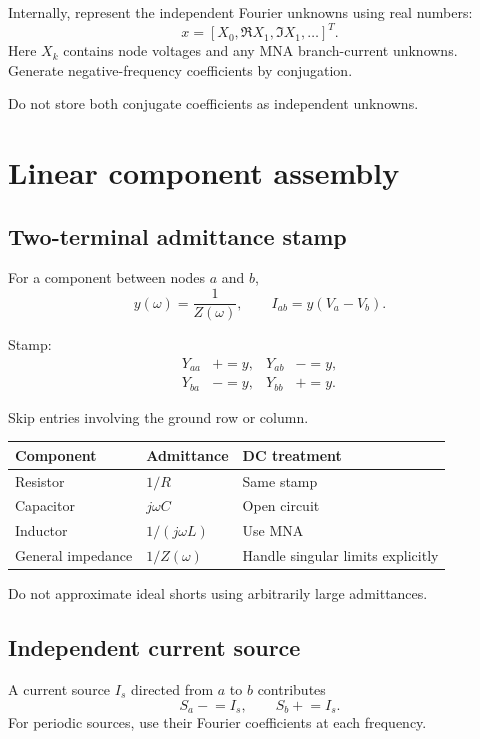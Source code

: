 \documentclass[11pt,a4paper]{article}
\begin{document}
Internally, represent the independent Fourier unknowns using real
numbers:
\[
  x=
  [X_0,\Re X_1,\Im X_1,\ldots]^T.
\]
Here $X_k$ contains node voltages and any MNA branch-current unknowns.
Generate negative-frequency coefficients by conjugation.

Do not store both conjugate coefficients as independent unknowns.

\section{Linear component assembly}

\subsection{Two-terminal admittance stamp}

For a component between nodes $a$ and $b$,
\[
  y(\omega)=\frac{1}{Z(\omega)}, \qquad
  I_{ab}=y(V_a-V_b).
\]

Stamp:
\[
\begin{aligned}
 Y_{aa}&\mathrel{+}=y,& Y_{ab}&\mathrel{-}=y,\\
 Y_{ba}&\mathrel{-}=y,& Y_{bb}&\mathrel{+}=y.
\end{aligned}
\]

Skip entries involving the ground row or column.

\begin{center}
\begin{tabular}{lll}
\toprule
Component & Admittance & DC treatment\\
\midrule
Resistor & $1/R$ & Same stamp\\
Capacitor & $j\omega C$ & Open circuit\\
Inductor & $1/(j\omega L)$ & Use MNA\\
General impedance & $1/Z(\omega)$ & Handle singular limits explicitly\\
\bottomrule
\end{tabular}
\end{center}

Do not approximate ideal shorts using arbitrarily large admittances.

\subsection{Independent current source}

A current source $I_s$ directed from $a$ to $b$ contributes
\[
  S_a\mathrel{-}=I_s,\qquad S_b\mathrel{+}=I_s.
\]
For periodic sources, use their Fourier coefficients at each frequency.
\end{document}
